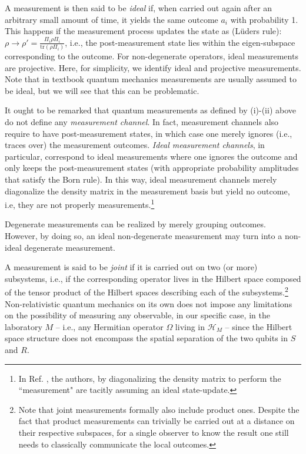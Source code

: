 \documentclass[12pt]{article}
\begin{document}
A measurement is then said to be \textit{ideal} if, when carried out again after an arbitrary small amount of time, it yields the same outcome $a_i$ with probability 1. This happens if the measurement process updates the state as (L\"uders rule): $\rho \rightarrow \rho'= \frac{\Pi_i \rho \Pi_i}{\text{tr} (\rho \Pi_i)}$, i.e., the post-measurement state lies within the eigen-subspace corresponding to the outcome. For non-degenerate operators, ideal measurements are projective. Here, for simplicity, we identify ideal and projective measurements. Note that in textbook quantum mechanics measurements are usually assumed to be ideal, but we will see that this can be problematic. 

It ought to be remarked that quantum measurements as defined by (i)-(ii) above do not define any \textit{measurement channel}. In fact, measurement channels also require to have post-measurement states, in which case one merely ignores (i.e., traces over) the measurement outcomes. \textit{Ideal measurement channels}, in particular,  correspond to ideal measurements where one ignores the outcome and only keeps the post-measurement states (with appropriate probability amplitudes that satisfy the Born rule). In this way, ideal measurement channels merely diagonalize the density matrix in the measurement basis but yield no outcome, i.e, they are not properly measurements.\footnote{In Ref. \cite{beckman2001causal}, the authors, by diagonalizing the density matrix to perform the ``measurement" are tacitly assuming an ideal state-update.}

Degenerate measurements can be realized by merely grouping outcomes. However, by doing so, an ideal non-degenerate measurement may turn into a non-ideal degenerate measurement.

A  measurement is said to be \textit{joint} if it is carried out on two (or more) subsystems, i.e., if the corresponding operator lives in the Hilbert space composed of the tensor product of the Hilbert spaces describing each of the subsystems.\footnote{Note that joint measurements formally also include product ones. Despite the fact that product measurements can trivially be carried out at a distance on their respective subspaces, for a single observer to know the result one still needs to classically communicate the local outcomes.} 
Non-relativistic quantum mechanics on its own does not impose any limitations on the possibility of measuring any observable, in our specific case, in the laboratory $M$ -- i.e., any Hermitian operator $\Omega$ living in $\mathcal{H}_M$ -- since the Hilbert space structure does not encompass the spatial  separation of the two qubits in $S$ and $R$.
\end{document}
